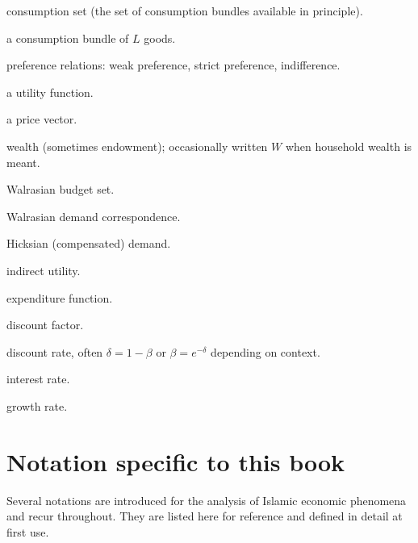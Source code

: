 \begin{notationbox}
\begin{description}[leftmargin=3cm,style=nextline]
    \item[{$\mathcal{X}$}] consumption set (the set of consumption bundles
        available in principle).
    \item[{$x = (x_1, \dots, x_L) \in \mathbb{R}^L_+$}] a consumption bundle
        of $L$ goods.
    \item[{$\succeq, \succ, \sim$}] preference relations: weak preference,
        strict preference, indifference.
    \item[{$u: \mathcal{X} \to \mathbb{R}$}] a utility function.
    \item[{$p = (p_1, \dots, p_L) \in \mathbb{R}^L_{++}$}] a price vector.
    \item[{$w$}] wealth (sometimes endowment); occasionally written
        $W$ when household wealth is meant.
    \item[{$B(p, w) = \{x \in \mathcal{X} : p \cdot x \leq w\}$}]
        Walrasian budget set.
    \item[{$x(p, w)$}] Walrasian demand correspondence.
    \item[{$h(p, u)$}] Hicksian (compensated) demand.
    \item[{$v(p, w)$}] indirect utility.
    \item[{$e(p, u)$}] expenditure function.
    \item[{$\beta \in (0, 1)$}] discount factor.
    \item[{$\delta$}] discount rate, often $\delta = 1 - \beta$ or
        $\beta = e^{-\delta}$ depending on context.
    \item[{$r$}] interest rate.
    \item[{$g$}] growth rate.
\end{description}
\end{notationbox}

\section*{Notation specific to this book}

Several notations are introduced for the analysis of Islamic economic
phenomena and recur throughout. They are listed here for reference and
defined in detail at first use.

